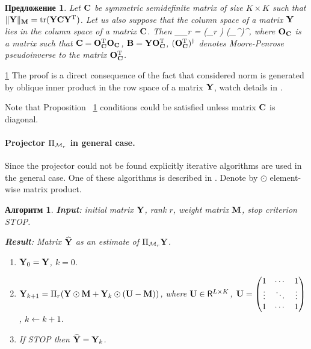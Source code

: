 \documentclass[12pt,a4paper,fleqn,leqno]{article}
\DeclareMathOperator{\tr}{tr}
\newtheorem{proposition}{Предложение}
\newtheorem{algorithm}{Алгоритм}
\begin{document}
\begin{proposition}
\label{prop:projS}
Let $\mathbf{C}$ be symmetric semidefinite matrix of size $K \times K$ such that $\|\bfY\|_\bfM = \tr(\bfY \bfC \bfY^\rmT)$.
Let us also suppose that the column space of a matrix $\mathbf{Y}$ lies in the column space of a matrix $\mathbf{C}$.
Then
\be
\label{eq:PiMr}
\Pi_{\calM_r} \bfY = (\Pi_r \bfB) (\bfO_\bfC^{\rmT})^\dagger,
\ee
where $\mathbf{O}_{\mathbf{C}}$ is a matrix such that $\mathbf{C} = \mathbf{O}_{\mathbf{C}}^{\mathrm{T}}\mathbf{O}_{\mathbf{C}}$,
$\mathbf{B} = \mathbf{Y} \mathbf{O}_{\mathbf{C}}^{\mathrm{T}}$, $(\mathbf{O}_{\mathbf{C}}^{\mathrm{T}})^\dagger$ denotes  Moore-Penrose pseudoinverse to the matrix $\mathbf{O}_{\mathbf{C}}^{\mathrm{T}}$.
\end{proposition}
\begin{proof5}{\ref{prop:projS}}
The proof is a direct consequence of the fact that considered norm is generated by oblique inner product in the row space of a matrix $\mathbf{Y}$, watch details in \cite{Golyandina2013}.
\end{proof5}

\begin{remark}
Note that Proposition ~\ref{prop:projS} conditions could be satisfied unless matrix $\mathbf{C}$ is diagonal.
\end{remark}

\paragraph{Projector $\Pi_{\mathcal{M}_r}$ in general case.}
Since the projector could not be found explicitly iterative algorithms are used in the general case.
One of these algorithms is described in \cite{Srebro2003}. Denote by $\odot$ element-wise matrix product.

\begin{algorithm}
\label{alg:weightedSVD}
\textbf{Input}: initial matrix $\mathbf{Y}$, rank $r$, weight matrix $\mathbf{M}$,
stop criterion STOP.

\textbf{Result}:
Matrix $\widehat{\mathbf{Y}}$ as an estimate of $\Pi_{\mathcal{M}_r} \mathbf{Y}$.

\begin{enumerate}
\item
$\mathbf{Y}_0 = \mathbf{Y}$, $k=0$.
\item
$\mathbf{Y}_{k+1} = \Pi_r(\mathbf{Y} \odot \mathbf{M} + \mathbf{Y}_{k} \odot (\mathbf{U} -  \mathbf{M}))$, where
$\mathbf{U} \in \mathsf{R}^{L \times K}$,  $\mathbf{U} = \begin{pmatrix}
1 & \cdots & 1 \\
\vdots & \ddots & \vdots \\
1 & \cdots & 1
\end{pmatrix}$, $k\leftarrow k+1$.
\item
If STOP then $\widehat{\mathbf{Y}} = \mathbf{Y}_k$.
\end{enumerate}
\end{algorithm}
\end{document}
